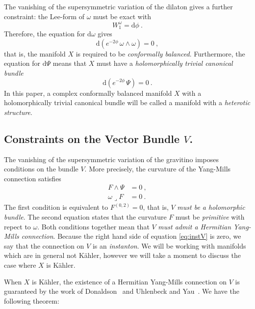 \documentclass[12pt,a4paper]{article}
\def\d{\textrm{d}}
\theoremstyle{definition}
\begin{document}
The vanishing of the supersymmetric variation of the dilaton gives a further constraint: the Lee-form of $\omega$ must be exact with
\[ W_1^\omega = \d\phi~.\]
Therefore, the equation for $\d\omega$ gives
\begin{equation}
\d( e^{-2\phi}\, \omega\wedge\omega) = 0~,\label{eq:confbal}
\end{equation}
that is, the manifold $X$ is required to be {\it conformally balanced}.
Furthermore, the equation for $\d\Psi$ means that $X$ must have a  {\it holomorphically trivial canonical bundle}
\begin{equation}
 \d(  e^{-2\phi}\, \Psi) = 0~.\label{eq:hol}
 \end{equation}
 In this paper, a complex conformally balanced manifold $X$ with a holomorphically trivial canonical bundle will be called a manifold with a {\it heterotic structure}.
 
 \subsection{Constraints on the Vector Bundle \texorpdfstring{$V$}\ .}
 \label{subsec:Vgeom}
 
 The vanishing of the supersymmetric variation of the gravitino imposes conditions on the bundle $V$.  More precisely, the curvature of the Yang-Mills connection satisfies
 \begin{align}
F\wedge\Psi  &= 0~,\label{eq:holF} \\
\omega\lrcorner F &= 0\label{eq:instV}~. 
 \end{align} 
The first condition is equivalent to $F^{(0,2)}= 0$, that is, $V$ {\it must be a holomorphic bundle}.  The second equation states that the curvature $F$ must be {\it primitive} with repect to $\omega$.  Both conditions together mean that  $V$ {\it must admit a  Hermitian Yang-Mills connection}.  Because the right hand side of equation \eqref{eq:instV} is zero, we say that the connection on  $V$ is an {\it instanton}.
We will be working with manifolds which are in general not K\"ahler, however we will take a moment to discuss the case where $X$ is K\"ahler.

When $X$ is K\"ahler, the existence  of a Hermitian Yang-Mills connection on $V$ is guaranteed by the work of Donaldson~\citep{0529.53018} and Uhlenbeck and Yau~\citep{MR861491, MR997570}.  We have the following theorem:
\vskip5pt
\end{document}
